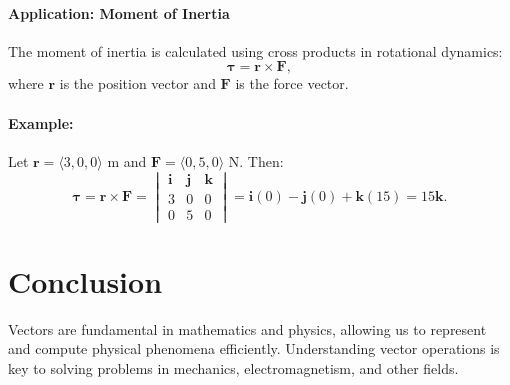 \documentclass[12pt]{article}
\begin{document}
\paragraph{Application: Moment of Inertia}
The moment of inertia is calculated using cross products in rotational dynamics:
\[
\mathbf{\tau} = \mathbf{r} \times \mathbf{F},
\]
where $\mathbf{r}$ is the position vector and $\mathbf{F}$ is the force vector.

\paragraph{Example:}
Let $\mathbf{r} = \langle 3, 0, 0 \rangle$ m and $\mathbf{F} = \langle 0, 5, 0 \rangle$ N. Then:
\[
\mathbf{\tau} = \mathbf{r} \times \mathbf{F} = \begin{vmatrix}
\mathbf{i} & \mathbf{j} & \mathbf{k} \\
 3 & 0 & 0 \\
 0 & 5 & 0
\end{vmatrix} = \mathbf{i}(0) - \mathbf{j}(0) + \mathbf{k}(15) = 15\mathbf{k}.
\]

\section{Conclusion}
Vectors are fundamental in mathematics and physics, allowing us to represent and compute physical phenomena efficiently. Understanding vector operations is key to solving problems in mechanics, electromagnetism, and other fields.
\end{document}
